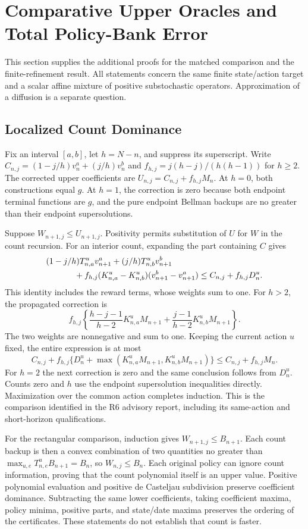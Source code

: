 \section{Comparative Upper Oracles and Total Policy-Bank Error}
This section supplies the additional proofs for the matched comparison and the finite-refinement result. All statements concern the same finite state/action target and a scalar affine mixture of positive substochastic operators. Approximation of a diffusion is a separate question.

\subsection{Localized Count Dominance}
Fix an interval $[a,b]$, let $h=N-n$, and suppress its superscript. Write
$C_{n,j}=(1-j/h)v_n^a+(j/h)v_n^b$ and
$f_{h,j}=j(h-j)/(h(h-1))$ for $h\geq2$.
The corrected upper coefficients are $U_{n,j}=C_{n,j}+f_{h,j}M_n$.
At $h=0$, both constructions equal $g$. At $h=1$, the correction is zero because both endpoint terminal functions are $g$, and the pure endpoint Bellman backups are no greater than their endpoint supersolutions.

Suppose $W_{n+1,j}\leq U_{n+1,j}$. Positivity permits substitution of $U$ for $W$ in the count recursion. For an interior count, expanding the part containing $C$ gives
\begin{align*}
 &(1-j/h)T^u_{n,a}v^a_{n+1}+(j/h)T^u_{n,b}v^b_{n+1}\\
 &\hspace{12mm}+f_{h,j}(K^u_{n,a}-K^u_{n,b})(v^b_{n+1}-v^a_{n+1})
 \leq C_{n,j}+f_{h,j}D_n^u.
\end{align*}
This identity includes the reward terms, whose weights sum to one. For $h>2$, the propagated correction is
\[
 f_{h,j}\left\{\frac{h-j-1}{h-2}K^u_{n,a}M_{n+1}
 +\frac{j-1}{h-2}K^u_{n,b}M_{n+1}\right\}.
\]
The two weights are nonnegative and sum to one. Keeping the current action $u$ fixed, the entire expression is at most
\[
 C_{n,j}+f_{h,j}\{D_n^u+\max(K^u_{n,a}M_{n+1},K^u_{n,b}M_{n+1})\}
 \leq C_{n,j}+f_{h,j}M_n.
\]
For $h=2$ the next correction is zero and the same conclusion follows from $D_n^u$. Counts zero and $h$ use the endpoint supersolution inequalities directly. Maximization over the common action completes induction. This is the comparison identified in the R6 advisory report, including its same-action and short-horizon qualifications.

For the rectangular comparison, induction gives $W_{n+1,j}\leq B_{n+1}$. Each count backup is then a convex combination of two quantities no greater than
$\max_{u,e}T^u_{n,e}B_{n+1}=B_n$, so $W_{n,j}\leq B_n$.
Each original policy can ignore count information, proving that the count polynomial itself is an upper value. Positive polynomial evaluation and positive de Casteljau subdivision preserve coefficient dominance. Subtracting the same lower coefficients, taking coefficient maxima, policy minima, positive parts, and state/date maxima preserves the ordering of the certificates. These statements do not establish that count is faster.


